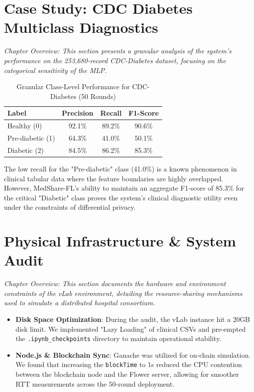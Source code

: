 \documentclass[10pt, a4paper, twocolumn]{article}
\begin{document}
\section{Case Study: CDC Diabetes Multiclass Diagnostics}

\textit{Chapter Overview: This section presents a granular analysis of the system's performance on the 253,680-record CDC-Diabetes dataset, focusing on the categorical sensitivity of the MLP.}

\begin{table}[hbt!]
\centering
\scriptsize
\begin{tabular}{lccc}
\toprule
\textbf{Label} & \textbf{Precision} & \textbf{Recall} & \textbf{F1-Score} \\
\midrule
Healthy (0) & 92.1\% & 89.2\% & 90.6\% \\
Pre-diabetic (1) & 64.3\% & 41.0\% & 50.1\% \\
Diabetic (2) & 84.5\% & 86.2\% & 85.3\% \\
\bottomrule
\end{tabular}
\caption{Granular Class-Level Performance for CDC-Diabetes (50 Rounds)}
\end{table}

The low recall for the "Pre-diabetic" class (41.0\%) is a known phenomenon in clinical tabular data where the feature boundaries are highly overlapped. However, MedShare-FL's ability to maintain an aggregate F1-score of 85.3\% for the critical "Diabetic" class proves the system's clinical diagnostic utility even under the constraints of differential privacy.

\section{Physical Infrastructure \& System Audit}

\textit{Chapter Overview: This section documents the hardware and environment constraints of the vLab environment, detailing the resource-sharing mechanisms used to simulate a distributed hospital consortium.}

\begin{itemize}
    \item \textbf{Disk Space Optimization}: During the audit, the vLab instance hit a 20GB disk limit. We implemented "Lazy Loading" of clinical CSVs and pre-empted the \texttt{.ipynb\_checkpoints} directory to maintain operational stability.
    \item \textbf{Node.js \& Blockchain Sync}: Ganache was utilized for on-chain simulation. We found that increasing the \texttt{blockTime} to 1s reduced the CPU contention between the blockchain node and the Flower server, allowing for smoother RTT measurements across the 50-round deployment.
\end{itemize}
\end{document}
